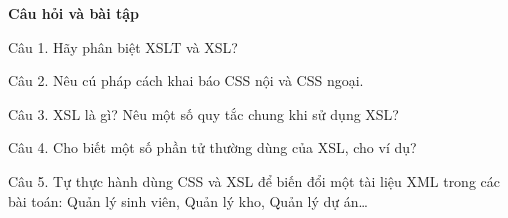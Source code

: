 \begin{center}
\textbf{Câu hỏi và bài tập}
\end{center}

Câu 1. Hãy phân biệt XSLT và XSL?

Câu 2. Nêu cú pháp cách khai báo CSS nội và CSS ngoại. 

Câu 3. XSL là gì? Nêu một số quy tắc chung khi sử dụng XSL? 

Câu 4. Cho biết một số phần tử thường dùng của XSL, cho ví dụ? 

Câu 5. Tự thực hành dùng CSS và XSL để biến đổi một tài liệu XML trong các bài toán: Quản lý sinh viên, Quản lý kho, Quản lý dự án…




